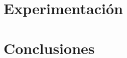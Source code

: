     \chapter{Experimentación}\label{ch:results}
    

    \backmatter

    \chapter*{Conclusiones}\label{ch:conclusion}
    

    


